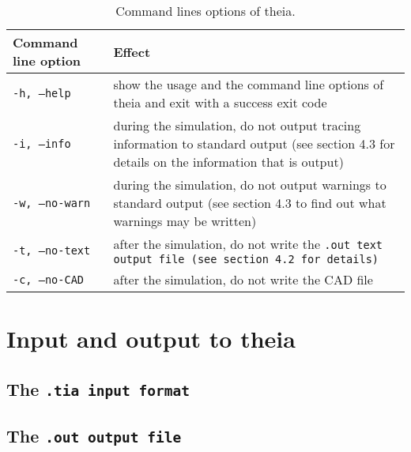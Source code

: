 \documentclass{article}
\begin{document}
\begin{table}[h]
\begin{center}
\begin{tabular}{| p{4cm} | p{10cm} |}
\hline
\textbf{Command line option} & \textbf{Effect} \\
\hline \hline
\tt{-h, --help} & show the usage and the command line options of theia and exit with a success exit code\\
\hline
\tt{-i, --info} & during the simulation, do not output tracing information to standard output (see section 4.3 for details on the information that is output)\\
\hline
\tt{-w, --no-warn} & during the simulation, do not output warnings to standard output (see section 4.3 to find out what warnings may be written)\\
\hline
\tt{-t, --no-text} & after the simulation, do not write the \tt{.out} text output file (see section 4.2 for details)\\
\hline
\tt{-c, --no-CAD} & after the simulation, do not write the CAD file\\
\hline
\end{tabular}
\end{center}
\label{option}
\caption{Command lines options of theia.}
\end{table}

\section{Input and output to theia}
\subsection{The \tt{.tia} input format}

\subsection{The \tt{.out} output file}
\end{document}

